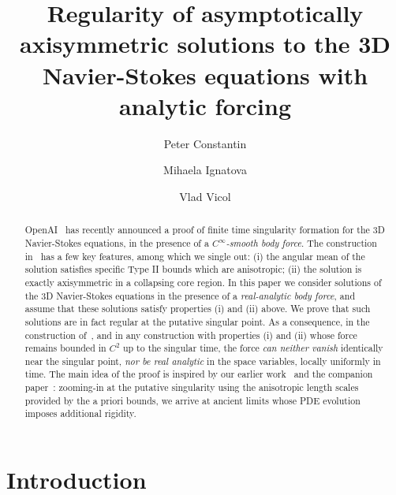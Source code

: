 \documentclass[11pt,reqno]{amsproc}
\title[Asymptotically axisymmetric Navier-Stokes with analytic forcing]{Regularity of asymptotically axisymmetric solutions to the 3D Navier-Stokes equations with analytic forcing}
\author{Peter Constantin}
\author{Mihaela Ignatova}
\author{Vlad Vicol}
\date{}
\numberwithin{equation}{section}
\theoremstyle{remark}
\begin{document}
\begin{abstract}
OpenAI~\cite{OpenAIManuscript} has recently announced a proof of finite time singularity formation for the 3D Navier-Stokes equations, in the presence of a \emph{$C^\infty$-smooth body force}. The construction in~\cite{OpenAIManuscript} has a few key features, among which we single out: (i) the angular mean of the solution satisfies specific Type II bounds which are anisotropic; (ii) the solution is exactly axisymmetric in a collapsing core region. In this paper we consider solutions of the 3D Navier-Stokes equations in the presence of a \emph{real-analytic body force}, and assume that these solutions satisfy properties (i) and (ii) above. We prove that such solutions are in fact regular at the putative singular point. As a consequence, in the construction of~\cite{OpenAIManuscript}, and in any construction with properties (i) and (ii) whose force remains bounded in $C^2$ up to the singular time, the force \emph{can neither vanish} identically near the singular point, \emph{nor be real analytic} in the space variables, locally uniformly in time. The main idea of the proof is inspired by our earlier work~\cite{CIV26} and the companion paper~\cite{CIVEulerLength}: zooming-in at the putative singularity using the anisotropic length scales provided by the a priori bounds, we arrive at ancient limits whose PDE evolution imposes additional rigidity.
\end{abstract}
\maketitle

\section{Introduction}
\label{sec:aniso:introduction}
\end{document}
